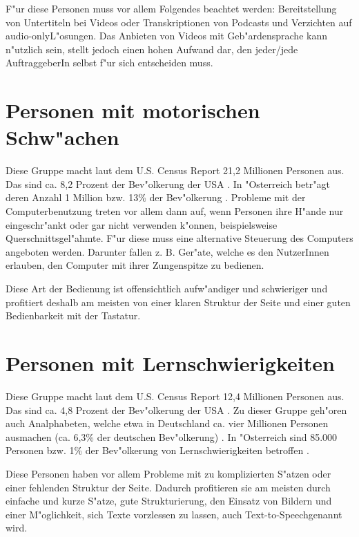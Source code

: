 \documentclass[a4paper,bibtotoc,oneside]{scrbook}
\begin{document}
F"ur diese Personen muss vor allem Folgendes beachtet werden: Bereitstellung von Untertiteln bei Videos oder Transkriptionen von Podcasts und Verzichten auf \glqq audio-only\grqq L"osungen. Das Anbieten von Videos mit Geb"ardensprache kann n"utzlich sein, stellt jedoch einen hohen Aufwand dar, den jeder/jede AuftraggeberIn selbst f"ur sich entscheiden muss. \cite[S. 17]{barr_webd}\cite[S. 20]{understand_acc}

\section{Personen mit motorischen Schw"achen}
Diese Gruppe macht laut dem U.S. Census Report 21,2 Millionen Personen aus. Das
sind ca. 8,2 Prozent der Bev"olkerung der USA \cite[S. 1]{us_cens}. In "Osterreich betr"agt deren Anzahl 1 Million bzw. 13\% der Bev"olkerung \cite[S. 12]{stat_austria}. Probleme mit der Computerbenutzung treten vor allem dann auf, wenn Personen ihre H"ande nur eingeschr"ankt oder gar nicht verwenden k"onnen, beispielsweise Querschnittsgel"ahmte. F"ur diese muss eine alternative Steuerung des Computers angeboten werden. Darunter fallen z. B. Ger"ate, welche es den NutzerInnen erlauben, den Computer mit ihrer Zungenspitze zu bedienen.\cite[S. 15-16]{barr_webd}

Diese Art der Bedienung ist offensichtlich aufw"andiger und schwieriger und profitiert deshalb am meisten von einer klaren Struktur der Seite und einer guten Bedienbarkeit mit der Tastatur.\cite[S. 15-16]{barr_webd}\cite[S. 18]{understand_acc}

\section{Personen mit Lernschwierigkeiten}
Diese Gruppe macht laut dem U.S. Census Report 12,4 Millionen Personen aus. Das
sind ca. 4,8 Prozent der Bev"olkerung der USA \cite[S. 1]{us_cens}. Zu dieser Gruppe geh"oren auch Analphabeten, welche etwa in Deutschland ca. vier Millionen Personen ausmachen (ca. 6,3\% der deutschen Bev"olkerung) \cite[S. 19]{understand_acc}. In "Osterreich sind 85.000 Personen bzw. 1\% der Bev"olkerung von Lernschwierigkeiten betroffen \cite[S. 14]{stat_austria}.

Diese Personen haben vor allem Probleme mit zu komplizierten S"atzen oder einer fehlenden Struktur der Seite. Dadurch profitieren sie am meisten durch einfache und kurze S"atze, gute Strukturierung, den Einsatz von Bildern und einer M"oglichkeit, sich Texte vorzlessen zu lassen, auch \glqq Text-to-Speech\grqq genannt wird. \cite[S. 18-19]{barr_webd}\cite[S. 19]{understand_acc}
\end{document}
